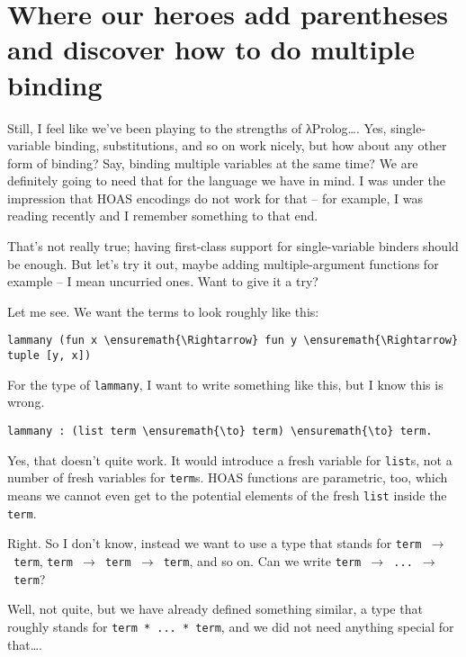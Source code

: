 \section{Where our heroes add parentheses and discover how to do
multiple
binding}\label{where-our-heroes-add-parentheses-and-discover-how-to-do-multiple-binding}

\heroSTUDENT{} Still, I feel like we've been playing to the strengths of
\foreignlanguage{greek}{λ}Prolog\ldots{}. Yes, single-variable binding, substitutions, and so on
work nicely, but how about any other form of binding? Say, binding
multiple variables at the same time? We are definitely going to need
that for the language we have in mind. I was under the impression that
HOAS encodings do not work for that -- for example, I was reading
\citet{keuchel2016needle} recently and I remember something to that end.

\heroADVISOR{} That's not really true; having first-class support for
single-variable binders should be enough. But let's try it out, maybe
adding multiple-argument functions for example -- I mean uncurried ones.
Want to give it a try?

\heroSTUDENT{} Let me see. We want the terms to look roughly like this:

\begin{verbatim}
lammany (fun x \ensuremath{\Rightarrow} fun y \ensuremath{\Rightarrow} tuple [y, x])
\end{verbatim}

For the type of \texttt{lammany}, I want to write something like this,
but I know this is wrong.

\begin{verbatim}
lammany : (list term \ensuremath{\to} term) \ensuremath{\to} term.
\end{verbatim}

\heroADVISOR{} Yes, that doesn't quite work. It would introduce a fresh
variable for \texttt{list}s, not a number of fresh variables for
\texttt{term}s. HOAS functions are parametric, too, which means we
cannot even get to the potential elements of the fresh \texttt{list}
inside the \texttt{term}.

\heroSTUDENT{} Right. So I don't know, instead we want to use a type that
stands for \texttt{term\ \ensuremath{\to}\ term},
\texttt{term\ \ensuremath{\to}\ term\ \ensuremath{\to}\ term}, and so on.
Can we write \texttt{term\ \ensuremath{\to}\ ...\ \ensuremath{\to}\ term}?

\heroADVISOR{} Well, not quite, but we have already defined something similar,
a type that roughly stands for \texttt{term\ *\ ...\ *\ term}, and we
did not need anything special for that\ldots{}.

